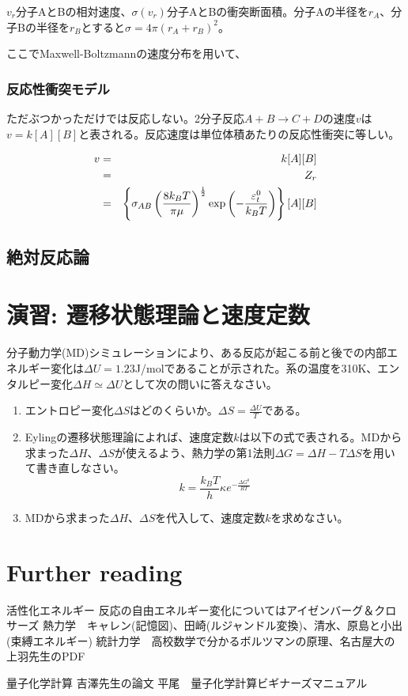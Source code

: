 \(v_r\)分子AとBの相対速度、\(\sigma(v_r)\)分子AとBの衝突断面積。分子Aの半径を\(r_A\)、分子Bの半径を\(r_B\)とすると\(\sigma = 4 \pi (r_A + r_B)^2\)。

ここでMaxwell-Boltzmannの速度分布を用いて、

\subsubsection{反応性衝突モデル}
ただぶつかっただけでは反応しない。2分子反応\(A+B \longrightarrow C+D\)の速度\(v\)は\(v=k[A][B]\)と表される。反応速度は単位体積あたりの反応性衝突に等しい。

\begin{eqnarray*}
v & = & k[A][B]\\
  & = & Z_r\\
  & = & \left\{ \sigma_{AB} \left(\frac{8k_B T}{\pi \mu}\right)^{\frac{1}{2}}{\rm exp}\left(-\frac{\varepsilon_t^{0}}{k_B T}\right) \right\} [A][B]\\
\end{eqnarray*}



\subsection{絶対反応論}

\section{演習: 遷移状態理論と速度定数}
分子動力学(MD)シミュレーションにより、ある反応が起こる前と後での内部エネルギー変化は\(\Delta U = 1.23\)J/molであることが示された。系の温度を310K、エンタルピー変化\(\Delta H \simeq \Delta U\)として次の問いに答えなさい。

\begin{enumerate}
\item エントロピー変化\(\Delta S\)はどのくらいか。\({\displaystyle \Delta S = \frac{\Delta U}{T}}\)である。
\item Eylingの遷移状態理論によれば、速度定数\(k\)は以下の式で表される。MDから求まった\(\Delta H\)、\(\Delta S\)が使えるよう、熱力学の第1法則\(\Delta G = \Delta H - T \Delta S\)を用いて書き直しなさい。
\[k = \frac{k_B T}{h}\kappa e^{-\frac{\Delta G^0}{RT}}\]
\item MDから求まった\(\Delta H\)、\(\Delta S\)を代入して、速度定数\(k\)を求めなさい。
\end{enumerate}


\section{Further reading} 
活性化エネルギー
反応の自由エネルギー変化についてはアイゼンバーグ＆クロサーズ
熱力学　キャレン(記憶図)、田崎(ルジャンドル変換)、清水、原島と小出(束縛エネルギー)
統計力学　高校数学で分かるボルツマンの原理、名古屋大の上羽先生のPDF

量子化学計算
吉澤先生の論文
平尾　量子化学計算ビギナーズマニュアル
